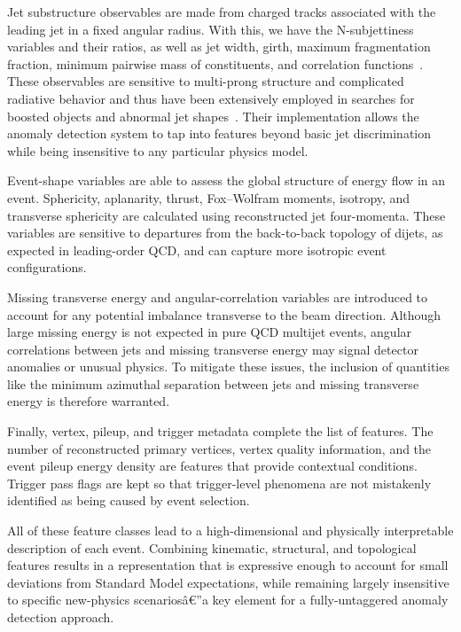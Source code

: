 \documentclass[11pt,a4paper,twocolumn]{article}
\begin{document}
Jet substructure observables are made from charged tracks associated with the leading jet in a fixed angular radius. With this, we have the N-subjettiness variables and their ratios, as well as jet width, girth, maximum fragmentation fraction, minimum pairwise mass of constituents, and correlation functions~\cite{Thaler2011NSubjettiness,Larkoski2013ECF}. These observables are sensitive to multi-prong structure and complicated radiative behavior and thus have been extensively employed in searches for boosted objects and abnormal jet shapes~\cite{Larkoski2020JetSubstructureReview,Marzani2019LookingInsideJets}. Their implementation allows the anomaly detection system to tap into features beyond basic jet discrimination while being insensitive to any particular physics model.

Event-shape variables are able to assess the global structure of energy flow in an event. Sphericity, aplanarity, thrust, Fox--Wolfram moments, isotropy, and transverse sphericity are calculated using reconstructed jet four-momenta. These variables are sensitive to departures from the back-to-back topology of dijets, as expected in leading-order QCD, and can capture more isotropic event configurations.

Missing transverse energy and angular-correlation variables are introduced to account for any potential imbalance transverse to the beam direction. Although large missing energy is not expected in pure QCD multijet events, angular correlations between jets and missing transverse energy may signal detector anomalies or unusual physics. To mitigate these issues, the inclusion of quantities like the minimum azimuthal separation between jets and missing transverse energy is therefore warranted.

Finally, vertex, pileup, and trigger metadata complete the list of features. The number of reconstructed primary vertices, vertex quality information, and the event pileup energy density are features that provide contextual conditions. Trigger pass flags are kept so that trigger-level phenomena are not mistakenly identified as being caused by event selection.

All of these feature classes lead to a high-dimensional and physically interpretable description of each event. Combining kinematic, structural, and topological features results in a representation that is expressive enough to account for small deviations from Standard Model expectations, while remaining largely insensitive to specific new-physics scenariosâ€”a key element for a fully-untaggered anomaly detection approach.
\end{document}
